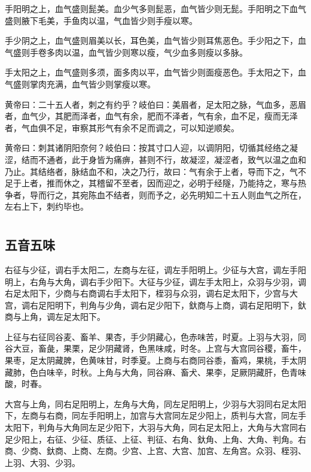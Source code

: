 \documentclass[a4paper,12pt,UTF8,twoside]{ctexbook}
\begin{document}
	手阳明之上，血气盛则髭美。血少气多则髭恶，血气皆少则无髭。手阳明之下血气盛则腋下毛美，手鱼肉以温，气血皆少则手瘦以寒。
	
	手少阴之上，血气盛则眉美以长，耳色美，血气皆少则耳焦恶色。手少阳之下，血气盛则手卷多肉以温，血气皆少则寒以瘦，气少血多则瘦以多脉。
	
	手太阳之上，血气盛则多须，面多肉以平，血气皆少则面瘦恶色。手太阳之下，血气盛则掌肉充满，血气皆少则掌瘦以寒。
	
	黄帝曰：二十五人者，刺之有约乎？岐伯曰：美眉者，足太阳之脉，气血多，恶眉者，血气少，其肥而泽者，血气有余，肥而不泽者，气有余，血不足，瘦而无泽者，气血俱不足，审察其形气有余不足而调之，可以知逆顺矣。
	
	黄帝曰：刺其诸阴阳奈何？岐伯曰：按其寸口人迎，以调阴阳，切循其经络之凝涩，结而不通者，此于身皆为痛痹，甚则不行，故凝涩，凝涩者，致气以温之血和乃止。其结络者，脉结血不和，决之乃行，故曰：气有余于上者，导而下之，气不足于上者，推而休之，其稽留不至者，因而迎之，必明于经隧，乃能持之，寒与热争者，导而行之，其宛陈血不结者，则而予之，必先明知二十五人则血气之所在，左右上下，刺约毕也。
	
	\part{}
	\chapter{五音五味}
	
	右征与少征，调右手太阳二，左商与左征，调左手阳明上。少征与大宫，调左手阳明上，右角与大角，调右手少阳下。大征与少征，调左手太阳上，众羽与少羽，调右足太阳下，少商与右商调右手太阳下，桎羽与众羽，调右足太阳下，少宫与大宫，调右足阳明下，判角与少角，调右足少阳下，釱商与上商，调右足阳明下，釱商与上角，调左足太阳下。
	
	上征与右征同谷麦、畜羊、果杏，手少阴藏心，色赤味苦，时夏。上羽与大羽，同谷大豆，畜彘，果栗，足少阴藏肾，色黑味咸，时冬。上宫与大宫同谷稷，畜牛，果枣，足太阴藏脾，色黄味甘，时季夏。上商与右商同谷黍，畜鸡，果桃，手太阴藏肺，色白味辛，时秋。上角与大角，同谷麻、畜犬、果李，足厥阴藏肝，色青味酸，时春。
	
	大宫与上角，同右足阳明上，左角与大角，同左足阳明上，少羽与大羽同右足太阳下，左商与右商，同左手阳明上，加宫与大宫同左足少阳上，质判与大宫，同左手太阳下，判角与大角同左足少阳下，大羽与大角，同右足太阳上，大角与大宫同右足少阳上，右征、少征、质征、上征、判征、右角、釱角、上角、大角、判角。右商、少商、釱商、上商、左商。少宫、上宫、大宫、加宫、左角宫。众羽、桎羽、上羽、大羽、少羽。
	
\end{document}
